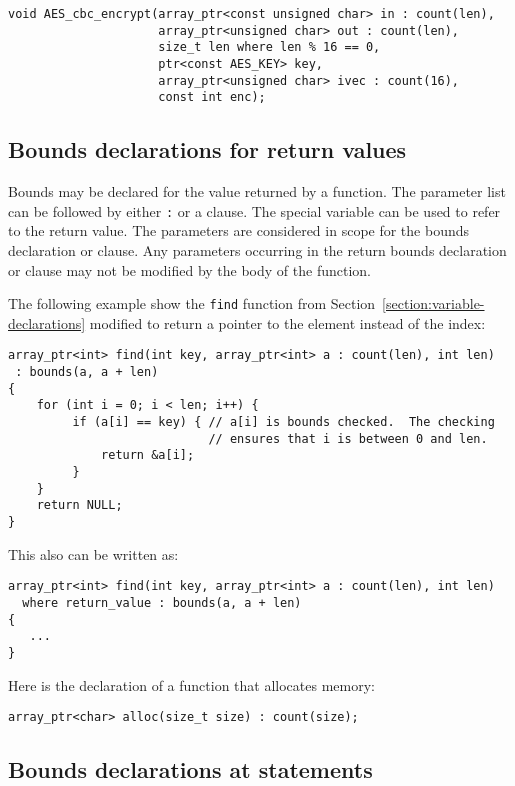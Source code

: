 \begin{verbatim}
void AES_cbc_encrypt(array_ptr<const unsigned char> in : count(len),
                     array_ptr<unsigned char> out : count(len),
                     size_t len where len % 16 == 0,
                     ptr<const AES_KEY> key,
                     array_ptr<unsigned char> ivec : count(16),
                     const int enc);
\end{verbatim}

\subsection{Bounds declarations for return values}

Bounds may be declared for the value returned by a function. The
parameter list can be followed by either \texttt{:}  or
a  clause. The special variable  can
be used to refer to the return value. The parameters are considered in
scope for the bounds declaration or  clause. Any parameters
occurring in the return bounds declaration or  clause may
not be modified by the body of the function.

The following example show the \texttt{find} function from
Section~\ref{section:variable-declarations} modified
to return a pointer to the element instead of the index:

\begin{verbatim}
array_ptr<int> find(int key, array_ptr<int> a : count(len), int len)
 : bounds(a, a + len)
{
    for (int i = 0; i < len; i++) {
         if (a[i] == key) { // a[i] is bounds checked.  The checking
                            // ensures that i is between 0 and len.
             return &a[i];
         }
    }
    return NULL;
}
\end{verbatim}

This also can be written as:

\begin{verbatim}
array_ptr<int> find(int key, array_ptr<int> a : count(len), int len)
  where return_value : bounds(a, a + len)
{
   ...
}
\end{verbatim}
Here is the declaration of a function that allocates memory:

\begin{verbatim}
array_ptr<char> alloc(size_t size) : count(size);
\end{verbatim}



\subsection{Bounds declarations at statements}
\label{section:statement-declarations}

